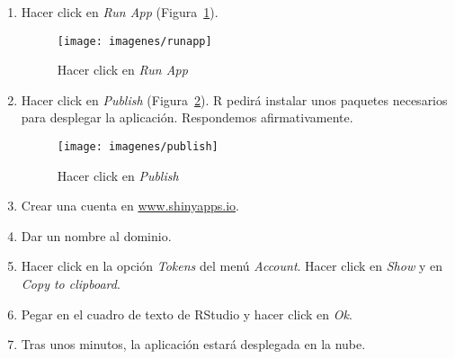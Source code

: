 \begin{enumerate}
	\item Hacer click en \textit{Run App} (Figura~\ref{fig:runapp}).
	
	\begin{figure}[htbp!]
		\centering
		\texttt{[image: imagenes/runapp]}
		\caption{Hacer click en \textit{Run App}}
		\label{fig:runapp}
	\end{figure}
	
	\item Hacer click en \textit{Publish} (Figura~\ref{fig:publish}). R pedirá instalar unos paquetes necesarios para desplegar la aplicación. Respondemos afirmativamente.
	
	\begin{figure}[htbp!]
		\centering
		\texttt{[image: imagenes/publish]}
		\caption{Hacer click en \textit{Publish}}
		\label{fig:publish}
	\end{figure}
	
	\item Crear una cuenta en \url{www.shinyapps.io}.
	
	\item Dar un nombre al dominio.
	
	\item Hacer click en la opción \textit{Tokens} del menú \textit{Account}. Hacer click en \textit{Show} y en \textit{Copy to clipboard}.
	
	\item Pegar en el cuadro de texto de RStudio y hacer click en \textit{Ok}.
	
	\item Tras unos minutos, la aplicación estará desplegada en la nube.
	
\end{enumerate}